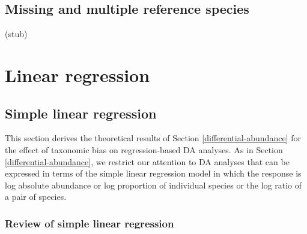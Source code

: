 \documentclass[
]{article}
\begin{document}
\hypertarget{multiple-references}{%
\subsection{Missing and multiple reference species}\label{multiple-references}}

(stub)

\hypertarget{appendix-regression}{%
\section{Linear regression}\label{appendix-regression}}

\hypertarget{simple-linear-regression}{%
\subsection{Simple linear regression}\label{simple-linear-regression}}

This section derives the theoretical results of Section \ref{differential-abundance} for the effect of taxonomic bias on regression-based DA analyses.
As in Section \ref{differential-abundance}, we restrict our attention to DA analyses that can be expressed in terms of the simple linear regression model in which the response is log absolute abundance or log proportion of individual species or the log ratio of a pair of species.

\hypertarget{review-of-simple-linear-regression}{%
\subsubsection{Review of simple linear regression}\label{review-of-simple-linear-regression}}
\end{document}
